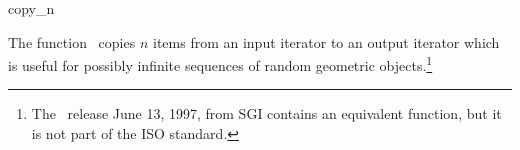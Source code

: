 

\begin{ccRefFunction}{copy_n}
  \label{sectionCopyN}
  \label{sectionGenericFunctions}

  \ccDefinition The function \ccRefName\ copies $n$ items from an
  input iterator to an output iterator which is useful for possibly
  infinite
  sequences of random geometric objects.\footnote{%
    The \stl\ release June 13, 1997, from SGI contains an equivalent
    function, but it is not part of the ISO standard.}
  
  
  
  \ccSeeAlso
\end{ccRefFunction}

